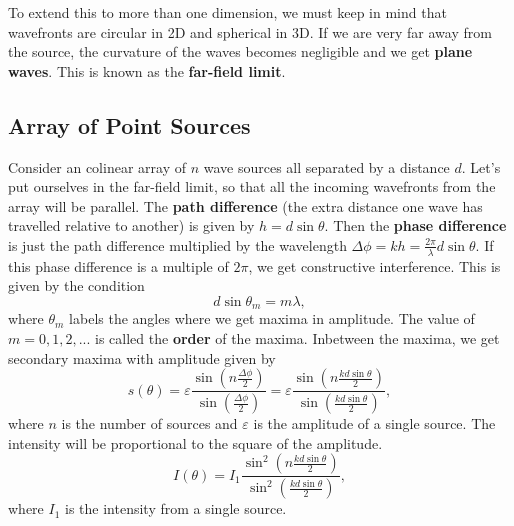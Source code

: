 \documentclass[../classical_mechanics.tex]{subfiles}
\begin{document}
        To extend this to more than one dimension, we must keep in mind that wavefronts are circular in 2D and spherical in 3D.
        If we are very far away from the source, the curvature of the waves becomes negligible and we get \textbf{plane waves}.
        This is known as the \textbf{far-field limit}.

        \subsection{Array of Point Sources}\label{subsec:array-of-point-sources}
            Consider an colinear array of $n$ wave sources all separated by a distance $d$.
            Let's put ourselves in the far-field limit, so that all the incoming wavefronts from the array will be parallel.
            The \textbf{path difference} (the extra distance one wave has travelled relative to another) is given by $h=d\sin\theta$.
            Then the \textbf{phase difference} is just the path difference multiplied by the wavelength $\Delta\phi=kh=\frac{2\pi}{\lambda}d\sin\theta$.
            If this phase difference is a multiple of $2\pi$, we get constructive interference.
            This is given by the condition
            \begin{equation}
                d\sin\theta_m=m\lambda,
            \end{equation}
            where $\theta_m$ labels the angles where we get maxima in amplitude.
            The value of $m=0,1,2,...$ is called the \textbf{order} of the maxima.
            Inbetween the maxima, we get secondary maxima with amplitude given by
            \begin{equation}
                s(\theta)=\varepsilon\frac{\sin\left(n\frac{\Delta\phi}{2}\right)}{\sin\left(\frac{\Delta\phi}{2}\right)}=\varepsilon\frac{\sin\left(n\frac{kd\sin\theta}{2}\right)}{\sin\left(\frac{kd\sin\theta}{2}\right)},
            \end{equation}
            where $n$ is the number of sources and $\varepsilon$ is the amplitude of a single source.
            The intensity will be proportional to the square of the amplitude.
            \begin{equation}
                I(\theta)=I_1\frac{\sin^2\left(n\frac{kd\sin\theta}{2}\right)}{\sin^2\left(\frac{kd\sin\theta}{2}\right)},
            \end{equation}
            where $I_1$ is the intensity from a single source.
\end{document}
